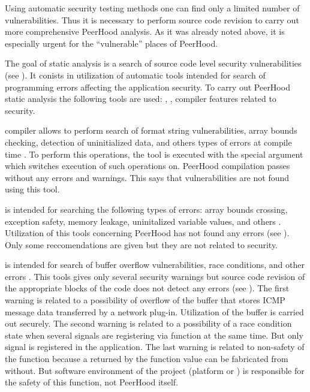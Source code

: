 %
Using automatic security testing methods one can find only a limited number of vulnerabilities. 
%
Thus it is necessary to perform source code revision to carry out more comprehensive PeerHood analysis. 
%
As it was already noted above, it is especially urgent for the ``vulnerable'' places of PeerHood. 



%
The goal of static analysis is a search of source code level security vulnerabilities (see ). 
%
It conists in utilization of automatic tools intended for search of programming errors affecting the application security. 
%
To carry out PeerHood static analysis the following tools are used: , ,  compiler features related to security. 

%
 compiler allows to perform search of format string vulnerabilities, array bounds checking, detection of uninitialized data, and others types of errors at compile time . 
%
To perform this operations, the tool is executed with the special  argument which switches execution of such operations on. 
%
PeerHood compilation passes without any errors and warnings. 
%
This says that vulnerabilities are not found using this tool. 

%
 is intended for searching the following types of errors: array bounds crossing, exception safety, memory leakage, uninitalized variable values, and others . 
%
Utilization of this tools concerning PeerHood has not found any errors (see ). 
%
Only some reccomendations are given but they are not related to security. 

%
 is intended for search of buffer overflow vulnerabilities, race conditions, and other errors . 
%
This tools gives only several security warnings but source code revision of the appropriate blocks of the code does not detect any errors (see ). 
%
The first warning is related to a possibility of overflow of the buffer that stores ICMP message data transferred by a network plug-in. 
%
Utilization of the buffer is carried out securely. 
%
The second warning is related to a possibility of a race condition state when several signals are registering via  function at the same time. 
%
But only signal is registered in the application. 
%
The last warning is related to non-safety of the  function because a returned by the function value can be fabricated from without. 
%
But software environment of the project (platform or ) is responsible for the safety of this function, not PeerHood itself. 

